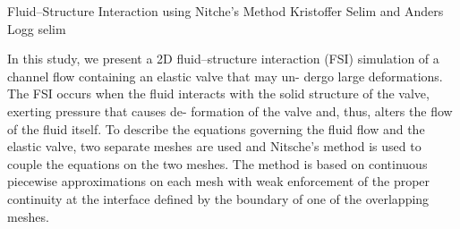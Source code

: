               {Fluid--Structure Interaction using Nitche's Method}
              {Kristoffer Selim and Anders Logg}
              {selim}

In this study, we present a 2D fluid--structure interaction (FSI)
simulation of a channel flow containing an elastic valve that may un-
dergo large deformations. The FSI occurs when the fluid interacts with
the solid structure of the valve, exerting pressure that causes de-
formation of the valve and, thus, alters the flow of the fluid
itself. To describe the equations governing the fluid flow and the
elastic valve, two separate meshes are used and Nitsche's method is
used to couple the equations on the two meshes. The method is based on
continuous piecewise approximations on each mesh with weak enforcement
of the proper continuity at the interface defined by the boundary of
one of the overlapping meshes.
